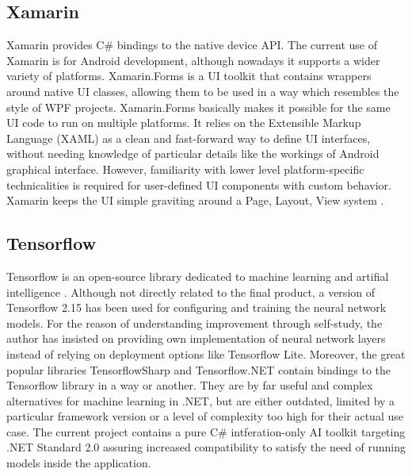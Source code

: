 \subsection{Xamarin}

Xamarin provides C\# bindings to the native device API. The current use of Xamarin is for Android development, although nowadays it supports a wider variety of platforms. Xamarin.Forms is a UI toolkit that contains wrappers around native UI classes, allowing them to be used in a way which resembles the style of WPF projects. Xamarin.Forms basically makes it possible for the same UI code to run on multiple platforms. It relies on the Extensible Markup Language (XAML) as a clean and fast-forward way to define UI interfaces, without needing knowledge of particular details like the workings of Android graphical interface. However, familiarity with lower level platform-specific technicalities is required for user-defined UI components with custom behavior. Xamarin keeps the UI simple graviting around a Page, Layout, View system \cite{xamarin}.

\subsection{Tensorflow}

Tensorflow is an open-source library dedicated to machine learning and artifial intelligence \cite{Tensorflow}. Although not directly related to the final product, a version of Tensorflow 2.15 has been used for configuring and training the neural network models. For the reason of understanding improvement through self-study, the author has insisted on providing own implementation of neural network layers instead of relying on deployment options like Tensorflow Lite. Moreover, the great popular libraries TensorflowSharp and Tensorflow.NET contain bindings to the Tensorflow library in a way or another. They are by far useful and complex alternatives for machine learning in .NET, but are either outdated, limited by a particular framework version or a level of complexity too high for their actual use case. The current project contains a pure C\# intferation-only AI toolkit targeting .NET Standard 2.0 assuring increased compatibility to satisfy the need of running models inside the application. 

